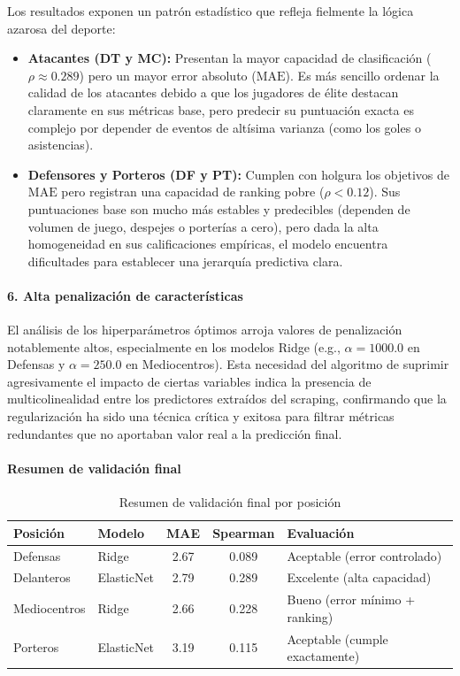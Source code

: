Los resultados exponen un patrón estadístico que refleja fielmente la 
lógica azarosa del deporte:
\begin{itemize}
  \item \textbf{Atacantes (DT y MC):} Presentan la mayor capacidad de 
        clasificación ($\rho \approx 0.289$) pero un mayor error absoluto 
        ($\mathrm{MAE}$). Es más sencillo ordenar la calidad de los atacantes 
        debido a que los jugadores de élite destacan claramente en sus 
        métricas base, pero predecir su puntuación exacta es complejo por 
        depender de eventos de altísima varianza (como los goles o asistencias).
  \item \textbf{Defensores y Porteros (DF y PT):} Cumplen con holgura los 
        objetivos de $\mathrm{MAE}$ pero registran una capacidad de ranking pobre 
        ($\rho < 0.12$). Sus puntuaciones base son mucho más estables y predecibles 
        (dependen de volumen de juego, despejes o porterías a cero), pero dada 
        la alta homogeneidad en sus calificaciones empíricas, el modelo 
        encuentra dificultades para establecer una jerarquía predictiva clara.
\end{itemize}

\paragraph{6. Alta penalización de características}

El análisis de los hiperparámetros óptimos arroja valores de penalización 
notablemente altos, especialmente en los modelos Ridge (e.g., $\alpha=1000.0$ 
en Defensas y $\alpha=250.0$ en Mediocentros). Esta necesidad del algoritmo 
de suprimir agresivamente el impacto de ciertas variables indica la presencia 
de multicolinealidad entre los predictores extraídos del scraping, confirmando 
que la regularización ha sido una técnica crítica y exitosa para filtrar métricas 
redundantes que no aportaban valor real a la predicción final.

\paragraph{Resumen de validación final}

\begin{table}[H]
\centering
\small
\begin{tabular}{|l|l|c|c|p{4cm}|}
\hline
\textbf{Posición} & \textbf{Modelo} & \textbf{MAE} & 
\textbf{Spearman} & \textbf{Evaluación} \\
\hline
Defensas & Ridge & 2.67 & 0.089 & Aceptable (error 
controlado) \\
Delanteros & ElasticNet & 2.79 & 0.289 & Excelente (alta 
capacidad) \\
Mediocentros & Ridge & 2.66 & 0.228 & Bueno (error mínimo + 
ranking) \\
Porteros & ElasticNet & 3.19 & 0.115 & Aceptable (cumple 
exactamente) \\
\hline
\end{tabular}
\caption{Resumen de validación final por posición}
\end{table}


